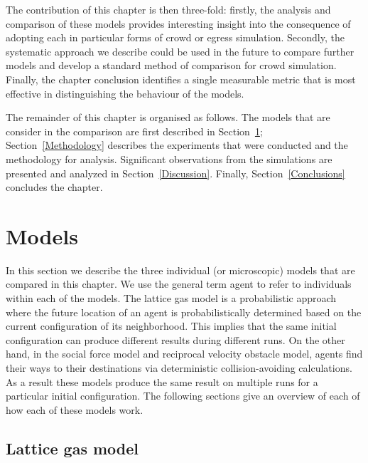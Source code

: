 The contribution of this chapter is then three-fold: firstly, the analysis and comparison of these models provides interesting insight into the consequence of adopting each in particular forms of crowd or egress simulation. Secondly, the systematic approach we describe could be used in the future to compare further models and develop a standard method of comparison for crowd simulation. Finally, the chapter conclusion identifies a single measurable metric that is most effective in distinguishing the behaviour of the models.

The remainder of this chapter is organised as follows. The models that are consider in the comparison are first described in Section~\ref{Models}; Section~\ref{Methodology} describes the experiments that were conducted and the methodology for analysis. Significant observations from the simulations are presented and analyzed in Section~\ref{Discussion}. Finally, Section~\ref{Conclusions} concludes the chapter.


\section{Models}
\label{Models}

In this section we describe the three individual (or microscopic) models that are compared in this chapter. We use the general term agent to refer to individuals within each of the models. The lattice gas model is a probabilistic approach where the future location of an agent is probabilistically determined based on the current configuration of its neighborhood. This implies that the same initial configuration can produce different results during different runs. On the other hand, in the social force model and reciprocal velocity obstacle model, agents find their ways to their destinations via deterministic collision-avoiding calculations. As a result these models produce the same result on multiple runs for a particular initial configuration. The following sections give an overview of each of how each of these models work.




\subsection{Lattice gas model}
\label{LatticeGasModel}

